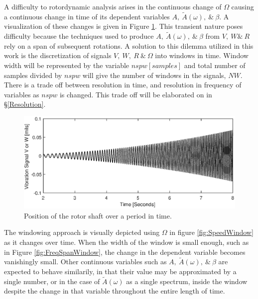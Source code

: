 A difficulty to rotordynamic analysis arises in the continuous change of $ \Omega $ causing a continuous change in time of its dependent variables $ A,\ \tilde{A}(\omega),\ \&\ \beta $. A visualization of these changes is given in Figure \ref{fig:PosOverTime}. This transient nature poses difficulty because the techniques used to produce $ A,\ \tilde{A}(\omega),\ \&\ \beta $ from $ V,\ W\&\ R $ rely on a span of subsequent rotations. A solution to this dilemma utilized in this work is the discretization of signals $ V,\ W,\ R\ \&\ \Omega $ into windows in time. Window width will be represented by the variable $ nspw[samples] $ and total number of samples divided by $ nspw $ will give the number of windows in the signals, $ NW $. There is a trade off between resolution in time, and resolution in frequency of variables as $ nspw $ is changed. This trade off will be elaborated on in \S\ref{Resolution}.\par 
\begin{figure}
	\centering
	\includegraphics[width=\linewidth]{./figures/Pos_Over_Time.eps}
	\caption{Position of the rotor shaft over a period in time.}
	\label{fig:PosOverTime}
\end{figure}
The windowing approach is visually depicted using $ \Omega $ in figure \ref{fig:SpeedWindow} as it changes over time. When the width of the window is small enough, such as in Figure \ref{fig:FreqSpanWindow}, the change in the dependent variable becomes vanishingly small. Other continuous variables such as $ A,\ \tilde{A}(\omega),\ \&\ \beta $ are expected to behave similarily, in that their value may be approximated by a single number, or in the case of $ \tilde{A}(\omega) $ as a single spectrum, inside the window despite the change in that variable throughout the entire length of time.
